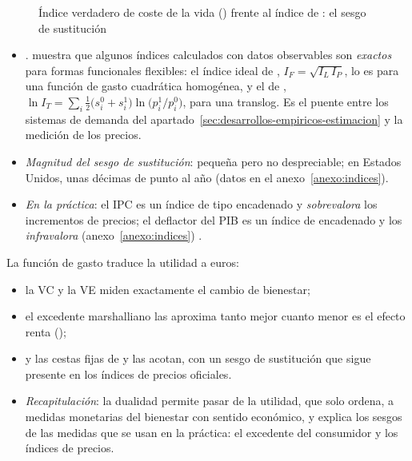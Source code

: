 \documentclass[11pt]{article}
\begin{document}
\begin{figure}[H]
\centering
\caption{Índice verdadero de coste de la vida () frente al índice de : el sesgo de sustitución}\label{fig:indice-konus-laspeyres}
\end{figure}

\begin{itemize}
\item {}. \textcite{Diewert1976Exact} muestra que algunos índices calculados con datos observables son \emph{exactos} para formas funcionales flexibles: el índice ideal de , $I_F=\sqrt{I_L\,I_P}$, lo es para una función de gasto cuadrática homogénea, y el de , $\ln I_T=\sum_i\tfrac12\big(s_i^0+s_i^1\big)\ln\big(p_i^1/p_i^0\big)$, para una translog. Es el puente entre los sistemas de demanda del apartado~\ref{sec:desarrollos-empiricos-estimacion} y la medición de los precios.
\item \emph{Magnitud del sesgo de sustitución}: pequeña pero no despreciable; en Estados Unidos, unas décimas de punto al año (datos en el anexo~\ref{anexo:indices}).
\item \emph{En la práctica}: el IPC es un índice de tipo  encadenado y \emph{sobrevalora} los incrementos de precios; el deflactor del PIB es un índice de  encadenado y los \emph{infravalora} (anexo~\ref{anexo:indices}) .
\end{itemize}

\begin{ideaclave}
La función de gasto traduce la utilidad a euros:
\begin{itemize}
\item la VC y la VE miden exactamente el cambio de bienestar;
\item el excedente marshalliano las aproxima tanto mejor cuanto menor es el efecto renta ();
\item y las cestas fijas de  y  las acotan, con un sesgo de sustitución que sigue presente en los índices de precios oficiales.
\end{itemize}
\end{ideaclave}

\begin{itemize}
\item \emph{Recapitulación}: la dualidad permite pasar de la utilidad, que solo ordena, a medidas monetarias del bienestar con sentido económico, y explica los sesgos de las medidas que se usan en la práctica: el excedente del consumidor y los índices de precios.
\end{itemize}
\end{document}
